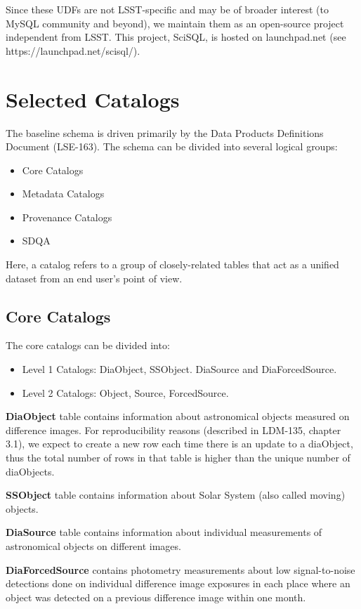 \documentclass[DM,toc]{lsstdoc}
\begin{document}
Since these UDFs are not LSST-specific and may be of broader interest (to MySQL community and beyond), we maintain them as an open-source project independent from LSST. This project, SciSQL, is hosted on launchpad.net (see https://launchpad.net/scisql/).

\section{Selected Catalogs}

The baseline schema is driven primarily by the Data Products Definitions Document (LSE-163). The schema can be divided into several logical groups:

\begin{itemize}
  \item Core Catalogs
  \item Metadata Catalogs
  \item Provenance Catalogs
  \item SDQA
\end{itemize}

Here, a catalog refers to a group of closely-related tables that act as a unified dataset from an end user's point of view.

\subsection{Core Catalogs}

The core catalogs can be divided into:
\begin{itemize}
  \item Level 1 Catalogs: DiaObject, SSObject. DiaSource and DiaForcedSource.
  \item Level 2 Catalogs: Object, Source, ForcedSource.
\end{itemize}

\textbf{DiaObject} table contains information about astronomical objects measured on difference images. For reproducibility reasons (described in LDM-135, chapter 3.1), we expect to create a new row each time there is an update to a diaObject, thus the total number of rows in that table is higher than the unique number of diaObjects. 

\textbf{SSObject} table contains information about Solar System (also called moving) objects.

\textbf{DiaSource} table contains information about individual measurements of astronomical objects on different images.

\textbf{DiaForcedSource} contains photometry measurements about low signal-to-noise detections done on individual difference image exposures in each place where an object was detected on a previous difference image within one month.
\end{document}

